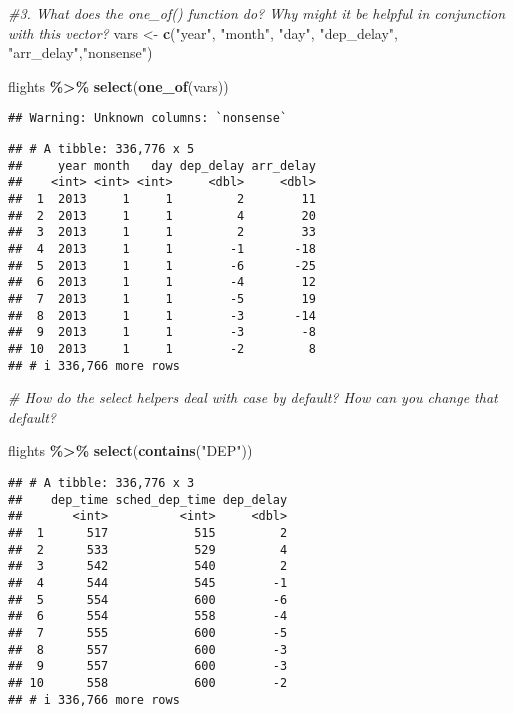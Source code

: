 \documentclass[
]{article}
\newenvironment{Shaded}{\begin{snugshade}}{\end{snugshade}}
\newcommand{\CommentTok}[1]{\textcolor[rgb]{0.56,0.35,0.01}{\textit{#1}}}
\newcommand{\FunctionTok}[1]{\textcolor[rgb]{0.13,0.29,0.53}{\textbf{#1}}}
\newcommand{\NormalTok}[1]{#1}
\newcommand{\OtherTok}[1]{\textcolor[rgb]{0.56,0.35,0.01}{#1}}
\newcommand{\SpecialCharTok}[1]{\textcolor[rgb]{0.81,0.36,0.00}{\textbf{#1}}}
\newcommand{\StringTok}[1]{\textcolor[rgb]{0.31,0.60,0.02}{#1}}
\begin{document}
\begin{Shaded}
\begin{Highlighting}[]
\CommentTok{\#3. What does the one\_of() function do? Why might it be helpful in conjunction with this vector?}
\NormalTok{vars }\OtherTok{\textless{}{-}} \FunctionTok{c}\NormalTok{(}\StringTok{"year"}\NormalTok{, }\StringTok{"month"}\NormalTok{, }\StringTok{"day"}\NormalTok{, }\StringTok{"dep\_delay"}\NormalTok{, }\StringTok{"arr\_delay"}\NormalTok{,}\StringTok{"nonsense"}\NormalTok{)}

\NormalTok{flights }\SpecialCharTok{\%\textgreater{}\%} \FunctionTok{select}\NormalTok{(}\FunctionTok{one\_of}\NormalTok{(vars))}
\end{Highlighting}
\end{Shaded}

\begin{verbatim}
## Warning: Unknown columns: `nonsense`
\end{verbatim}

\begin{verbatim}
## # A tibble: 336,776 x 5
##     year month   day dep_delay arr_delay
##    <int> <int> <int>     <dbl>     <dbl>
##  1  2013     1     1         2        11
##  2  2013     1     1         4        20
##  3  2013     1     1         2        33
##  4  2013     1     1        -1       -18
##  5  2013     1     1        -6       -25
##  6  2013     1     1        -4        12
##  7  2013     1     1        -5        19
##  8  2013     1     1        -3       -14
##  9  2013     1     1        -3        -8
## 10  2013     1     1        -2         8
## # i 336,766 more rows
\end{verbatim}

\begin{Shaded}
\begin{Highlighting}[]
\CommentTok{\# How do the select helpers deal with case by default? How can you change that default?}

\NormalTok{flights }\SpecialCharTok{\%\textgreater{}\%} \FunctionTok{select}\NormalTok{(}\FunctionTok{contains}\NormalTok{(}\StringTok{"DEP"}\NormalTok{))}
\end{Highlighting}
\end{Shaded}

\begin{verbatim}
## # A tibble: 336,776 x 3
##    dep_time sched_dep_time dep_delay
##       <int>          <int>     <dbl>
##  1      517            515         2
##  2      533            529         4
##  3      542            540         2
##  4      544            545        -1
##  5      554            600        -6
##  6      554            558        -4
##  7      555            600        -5
##  8      557            600        -3
##  9      557            600        -3
## 10      558            600        -2
## # i 336,766 more rows
\end{verbatim}
\end{document}
